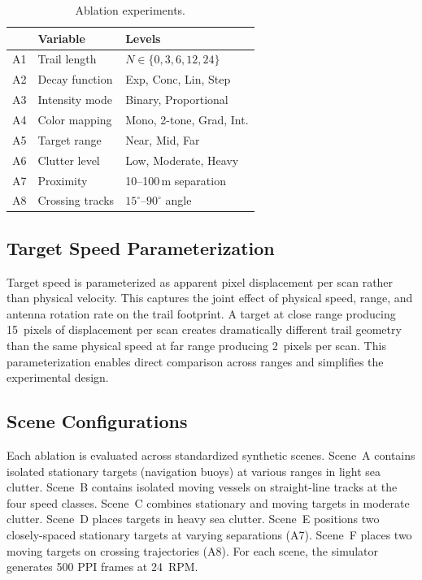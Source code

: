 \documentclass[colorlinks,upint,balance]{asmeconf}
\begin{document}
\begin{table}[t]
\caption{Ablation experiments.}
\label{tab:ablations}
\centering
\footnotesize
\begin{tabular}{@{}lll@{}}
\toprule
 & \textbf{Variable} & \textbf{Levels} \\
\midrule
A1 & Trail length & $N \in \{0,3,6,12,24\}$ \\
A2 & Decay function & Exp, Conc, Lin, Step \\
A3 & Intensity mode & Binary, Proportional \\
A4 & Color mapping & Mono, 2-tone, Grad, Int. \\
A5 & Target range & Near, Mid, Far \\
A6 & Clutter level & Low, Moderate, Heavy \\
A7 & Proximity & 10--100\,m separation \\
A8 & Crossing tracks & $15^\circ$--$90^\circ$ angle \\
\bottomrule
\end{tabular}
\end{table}

\subsection{Target Speed Parameterization}

Target speed is parameterized as apparent pixel displacement per scan rather than physical velocity. This captures the joint effect of physical speed, range, and antenna rotation rate on the trail footprint. A target at close range producing 15~pixels of displacement per scan creates dramatically different trail geometry than the same physical speed at far range producing 2~pixels per scan. This parameterization enables direct comparison across ranges and simplifies the experimental design.

\subsection{Scene Configurations}

Each ablation is evaluated across standardized synthetic scenes. Scene~A contains isolated stationary targets (navigation buoys) at various ranges in light sea clutter. Scene~B contains isolated moving vessels on straight-line tracks at the four speed classes. Scene~C combines stationary and moving targets in moderate clutter. Scene~D places targets in heavy sea clutter. Scene~E positions two closely-spaced stationary targets at varying separations (A7). Scene~F places two moving targets on crossing trajectories (A8). For each scene, the simulator generates 500 PPI frames at 24~RPM.
\end{document}
